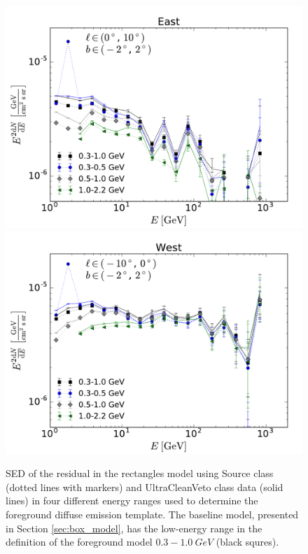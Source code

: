 \begin{figure}[h]
\centering
\includegraphics[width=\twopic\textwidth]{plots/SED_different_lowE_ranges_boxes_l=5_b=0.pdf}
\includegraphics[width=\twopic\textwidth]{plots/SED_different_lowE_ranges_boxes_l=-5_b=0.pdf}
\caption{SED of the residual in the rectangles model using Source class (dotted lines with markers) and UltraCleanVeto class data (solid lines) 
in four different energy ranges used to determine the foreground diffuse emission template. 
The baseline model, presented in Section \ref{sec:box_model}, has the low-energy range in the definition of the foreground model
$0.3 - \SI{1.0}{GeV}$ (black squres).}
\label{fig:syst_models}
\end{figure}

